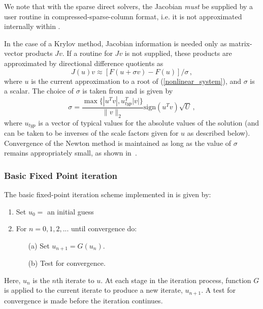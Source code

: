 We note that with the sparse direct solvers, the Jacobian {\em must}
be supplied by a user routine in compressed-sparse-column format,
i.e. it is not approximated internally within {\kinsol}.

In the case of a Krylov method, Jacobian information is needed 
only as matrix-vector products $Jv$.  If a routine for $Jv$ is 
not supplied, these products are approximated by directional
difference quotients as
\begin{equation}\label{e:JvDQ}
J(u) v \approx [F(u+\sigma v) - F(u)]/\sigma \, ,
\end{equation}
where $u$ is the current approximation to a root of
(\ref{nonlinear_system}), and $\sigma$ is a scalar. The choice of
$\sigma$ is taken from \cite{BrSa:90} and is given by
\begin{equation}\label{e:sigmaDQ_iterative}
  \sigma = \frac{\max \{|u^T v|, u^T_{typ} |v|\}}{\|v\|_2}
  \mbox{sign}(u^T v) \sqrt{U} \, ,
\end{equation}
where $u_{typ}$ is a vector of typical values for the absolute
values of the solution (and can be taken to be inverses of the
scale factors given for $u$ as described below).
Convergence of the Newton method is maintained as long as the
value of $\sigma$ remains appropriately small, as shown in~\cite{Bro:87}.


\subsubsection*{Basic Fixed Point iteration}
The basic fixed-point iteration scheme implemented in {\kinsol} is given by:

\vspace{1ex}
\begin{enumerate}
   \item Set $u_0 = $ an initial guess
   \item For $n = 0, 1, 2,...$ until convergence do:
      \begin{itemize}
          \item[(a)] Set $u_{n+1} = G(u_n)$.
          \item[(b)] Test for convergence.
      \end{itemize}
\end{enumerate}
Here, $u_n$ is the $n$th iterate to $u$.
At each stage in the iteration process, function $G$ is applied to the current 
iterate to produce a new iterate, $u_{n+1}$.
A test for convergence is made before the iteration continues.


